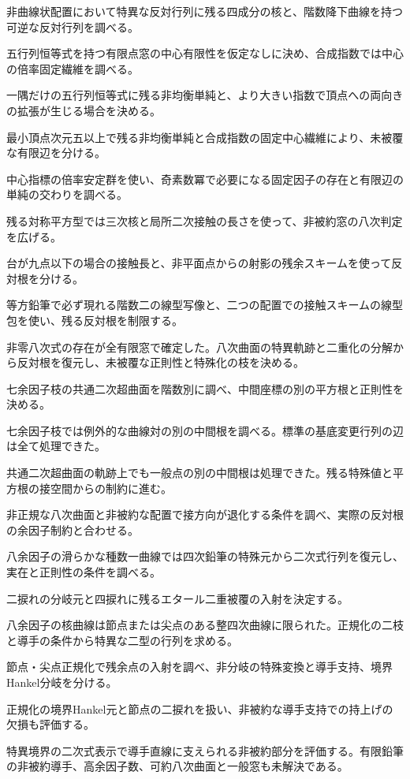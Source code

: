 \documentclass[11pt,a4paper]{ltjsarticle}
\begin{document}
非曲線状配置において特異な反対行列に残る四成分の核と、階数降下曲線を持つ可逆な反対行列を調べる。

五行列恒等式を持つ有限点窓の中心有限性を仮定なしに決め、合成指数では中心の倍率固定繊維を調べる。

一隅だけの五行列恒等式に残る非均衡単純と、より大きい指数で頂点への両向きの拡張が生じる場合を決める。

最小頂点次元五以上で残る非均衡単純と合成指数の固定中心繊維により、未被覆な有限辺を分ける。

中心指標の倍率安定群を使い、奇素数冪で必要になる固定因子の存在と有限辺の単純の交わりを調べる。

残る対称平方型では三次核と局所二次接触の長さを使って、非被約窓の八次判定を広げる。

台が九点以下の場合の接触長と、非平面点からの射影の残余スキームを使って反対根を分ける。

等方鉛筆で必ず現れる階数二の線型写像と、二つの配置での接触スキームの線型包を使い、残る反対根を制限する。

非零八次式の存在が全有限窓で確定した。八次曲面の特異軌跡と二重化の分解から反対根を復元し、未被覆な正則性と特殊化の枝を決める。

七余因子枝の共通二次超曲面を階数別に調べ、中間座標の別の平方根と正則性を決める。

七余因子枝では例外的な曲線対の別の中間根を調べる。標準の基底変更行列の辺は全て処理できた。

共通二次超曲面の軌跡上でも一般点の別の中間根は処理できた。残る特殊値と平方根の接空間からの制約に進む。

非正規な八次曲面と非被約な配置で接方向が退化する条件を調べ、実際の反対根の余因子制約と合わせる。

八余因子の滑らかな種数一曲線では四次鉛筆の特殊元から二次式行列を復元し、実在と正則性の条件を調べる。

二捩れの分岐元と四捩れに残るエタール二重被覆の入射を決定する。

八余因子の核曲線は節点または尖点のある整四次曲線に限られた。正規化の二枝と導手の条件から特異な二型の行列を求める。

節点・尖点正規化で残余点の入射を調べ、非分岐の特殊変換と導手支持、境界Hankel分岐を分ける。

正規化の境界Hankel元と節点の二捩れを扱い、非被約な導手支持での持上げの欠損も評価する。

特異境界の二次式表示で導手直線に支えられる非被約部分を評価する。有限鉛筆の非被約導手、高余因子数、可約八次曲面と一般窓も未解決である。
\end{document}

